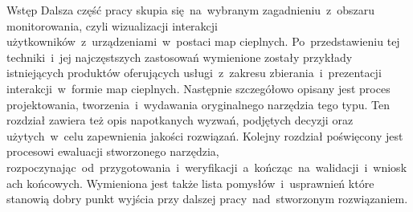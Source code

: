 \begin{chapter}{Wstęp}
	Dalsza część pracy skupia się~na~wybranym zagadnieniu~z~obszaru monitorowania, czyli wizualizacji interakcji użytkowników~z~urządzeniami~w~postaci map cieplnych. Po~przedstawieniu tej techniki~i~jej najczęstszych zastosowań wymienione zostały przykłady istniejących produktów oferujących usługi~z~zakresu zbierania~i~prezentacji interakcji~w~formie map cieplnych. Następnie szczegółowo opisany jest proces projektowania, tworzenia~i~wydawania oryginalnego narzędzia tego typu. Ten rozdział zawiera też opis napotkanych wyzwań, podjętych decyzji oraz użytych~w~celu zapewnienia jakości rozwiązań. Kolejny rozdział poświęcony jest procesowi ewaluacji stworzonego narzędzia, rozpoczynając~od~przygotowania~i~weryfikacji~a~kończąc~na~walidacji~i~wnioskach końcowych. Wymieniona jest także lista pomysłów~i~usprawnień które stanowią dobry punkt wyjścia przy dalszej pracy~nad~stworzonym rozwiązaniem.
\end{chapter}
